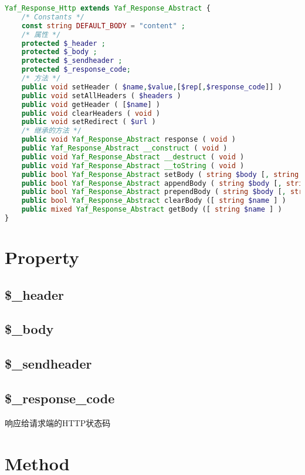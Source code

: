 \begin{lstlisting}[language=PHP]
Yaf_Response_Http extends Yaf_Response_Abstract {
    /* Constants */
    const string DEFAULT_BODY = "content" ;
    /* 属性 */
    protected $_header ;
    protected $_body ;
    protected $_sendheader ;
    protected $_response_code;
    /* 方法 */
    public void setHeader ( $name,$value,[$rep[,$response_code]] )
    public void setAllHeaders ( $headers )
    public void getHeader ( [$name] )
    public void clearHeaders ( void )
    public void setRedirect ( $url )
    /* 继承的方法 */
    public void Yaf_Response_Abstract response ( void )
    public Yaf_Response_Abstract __construct ( void )
    public void Yaf_Response_Abstract __destruct ( void )
    public void Yaf_Response_Abstract __toString ( void )
    public bool Yaf_Response_Abstract setBody ( string $body [, string $name ] )
    public bool Yaf_Response_Abstract appendBody ( string $body [, string $name ] )
    public bool Yaf_Response_Abstract prependBody ( string $body [, string $name ] )
    public bool Yaf_Response_Abstract clearBody ([ string $name ] )
    public mixed Yaf_Response_Abstract getBody ([ string $name ] )
}
\end{lstlisting}

\section{Property}

\subsection{\$\_header}


\subsection{\$\_body}


\subsection{\$\_sendheader}


\subsection{\$\_response\_code}

响应给请求端的HTTP状态码


\section{Method}


